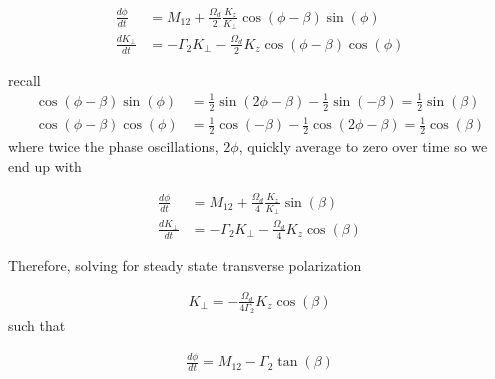 \documentclass{article}
\begin{document}
\begin{align}
      \frac{d \phi}{dt} &=  M_{12} +\frac{\Omega_d}{2} \frac{K_z}{K_{\perp}} \cos{\left(\phi-\beta\right)}\sin{\left(\phi\right)}\\
     \frac{d K_{\perp}}{dt}  &= -\Gamma_2 K_{\perp} - \frac{\Omega_d}{2} K_z \cos{\left(\phi-\beta\right)}\cos{\left(\phi\right)}
\end{align}

recall
\begin{align}
     \cos{\left(\phi-\beta\right)}\sin{\left(\phi\right)} &=\frac{1}{2}\sin{\left(2\phi-\beta\right)} - \frac{1}{2}\sin{\left(-\beta\right)} = \frac{1}{2}\sin{\left(\beta\right)}\\
     \cos{\left(\phi-\beta\right)}\cos{\left(\phi\right)} &= \frac{1}{2}\cos{\left(-\beta\right)} - \frac{1}{2}\cos{\left(2\phi-\beta\right)} = \frac{1}{2}\cos{\left(\beta\right)}
\end{align}
where twice the phase oscillations, $2\phi$, quickly average to zero over time so we end up with

\begin{align}
      \frac{d \phi}{dt} &=  M_{12} +\frac{\Omega_d}{4} \frac{K_z}{K_{\perp}}\sin{\left(\beta\right)}\\
     \frac{d K_{\perp}}{dt}  &= -\Gamma_2 K_{\perp} - \frac{\Omega_d}{4} K_z \cos{\left(\beta\right)}
\end{align}

Therefore, solving for steady state transverse polarization 

\begin{align}
     \boxed{K_{\perp} = -\frac{\Omega_d}{4\Gamma_2} K_z \cos{\left(\beta\right)}}
\end{align}
such that

\begin{align}
      \boxed{\frac{d \phi}{dt} =  M_{12} -\Gamma_2 \tan{\left(\beta\right)}}
\end{align}
\end{document}
